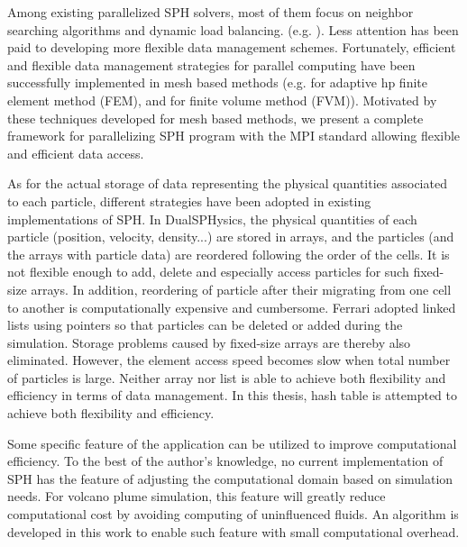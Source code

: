 Among existing parallelized SPH solvers, most of them focus on neighbor searching algorithms and dynamic load balancing. (e.g. \cite{ferrari2009new, crespo2015dualsphysics}). Less attention has been paid to developing more flexible data management schemes.
Fortunately, efficient and flexible data management strategies for parallel computing have been successfully implemented in mesh based methods (e.g. \cite{laszloffy2000simple} for adaptive hp finite element method (FEM), and \cite{patra2005parallel} for finite volume method (FVM)). Motivated by these techniques developed for mesh based methods, we present a complete framework for parallelizing SPH program with the MPI standard allowing flexible and efficient data access.

As for the actual storage of data representing the physical quantities associated to each particle, different strategies have been adopted in existing implementations of SPH. 
In DualSPHysics\cite{crespo2015dualsphysics}, the physical quantities of each particle (position, velocity, density...) are stored in arrays, and the particles (and the arrays with particle data) are reordered following the order of the cells. It is not flexible enough to add, delete and especially access particles for such fixed-size arrays. In addition, reordering of particle after their migrating from one cell to another is computationally expensive and cumbersome. Ferrari\cite{ferrari2009new} adopted linked lists using pointers so that particles can be deleted or added during the simulation. Storage problems caused by fixed-size arrays are thereby also eliminated. However, the element access speed becomes slow when total number of particles is large. Neither array nor list is able to achieve both flexibility and efficiency in terms of data management. In this thesis, hash table is attempted to achieve both flexibility and efficiency.

Some specific feature of the application can be utilized to improve computational efficiency. To the best of the author's knowledge, no current implementation of SPH has the feature of adjusting the computational domain based on simulation needs. For volcano plume simulation, this feature will greatly reduce computational cost by avoiding computing of uninfluenced fluids. An algorithm is developed in this work to enable such feature with small computational overhead.

